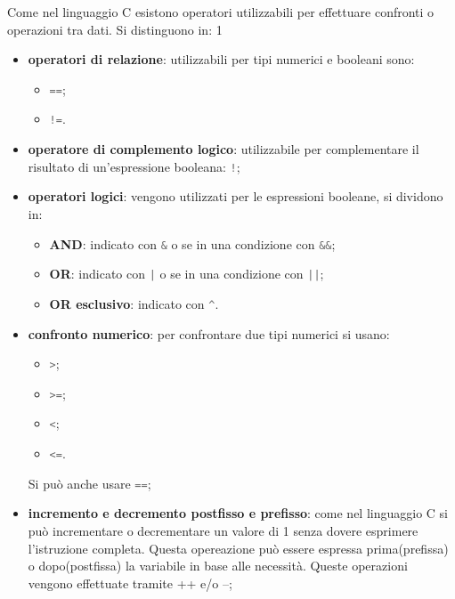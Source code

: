 \documentclass{subfile}
\begin{document}
    Come nel linguaggio C esistono operatori utilizzabili per effettuare confronti o operazioni tra dati. Si distinguono in:
    1\begin{itemize}
        \item \textbf{operatori di relazione}: utilizzabili per tipi numerici e booleani sono: 
        \begin{itemize}
            \item \lstinline[language = java]{==};
            \item  \lstinline[language = java]{!=}.
        \end{itemize}
        \item \textbf{operatore di complemento logico}: utilizzabile per complementare il risultato di un'espressione booleana: 
        \lstinline[language = java]{!};
        \item \textbf{operatori logici}: vengono utilizzati per le espressioni booleane, si dividono in:
        \begin{itemize}
            \item \textbf{AND}: indicato con \lstinline[language = java]{&} o se in una condizione con \lstinline[language = java]{&&};
            \item \textbf{OR}: indicato con \lstinline[language = java]{|} o se in una condizione con \lstinline[language = java]{||};
            \item \textbf{OR esclusivo}: indicato con \lstinline[language = java]{^}.
        \end{itemize}
        \item \textbf{confronto numerico}: per confrontare due tipi numerici si usano:
        \begin{itemize}
            \item \lstinline[language = java]{>};
            \item \lstinline[language = java]{>=};
            \item \lstinline[language = java]{<};
            \item \lstinline[language = java]{<=}.
        \end{itemize}
        Si può anche usare \lstinline[language = java]{==};
        \item \textbf{incremento e decremento postfisso e prefisso}: come nel linguaggio C si può incrementare o decrementare un valore di 1
        senza dovere esprimere l'istruzione completa. Questa opereazione può essere espressa prima(prefissa) o dopo(postfissa) la variabile
        in base alle necessità. Queste operazioni vengono effettuate tramite ++ e/o --;

\end{itemize}
\end{document}
